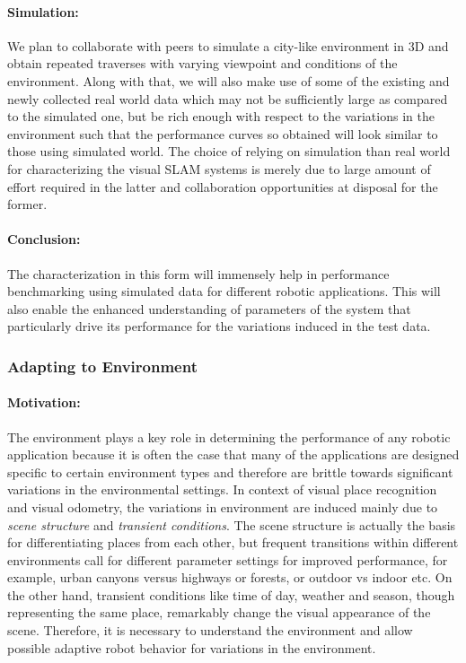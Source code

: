 \documentclass{article}
\begin{document}
\paragraph{Simulation:}We plan to collaborate with peers to simulate a city-like environment in 3D and obtain repeated traverses with varying viewpoint and conditions of the environment. Along with that, we will also make use of some of the existing and newly collected real world data which may not be sufficiently large as compared to the simulated one, but be rich enough with respect to the variations in the environment such that the performance curves so obtained will look similar to those using simulated world. The choice of relying on simulation than real world for characterizing the visual SLAM systems is merely due to large amount of effort required in the latter and collaboration opportunities at disposal for the former. 

\paragraph{Conclusion:}The characterization in this form will immensely help in performance benchmarking using simulated data for different robotic applications. This will also enable the enhanced understanding of parameters of the system that particularly drive its performance for the variations induced in the test data.

\subsubsection{Adapting to Environment}
\paragraph{Motivation:}The environment plays a key role in determining the performance of any robotic application because it is often the case that many of the applications are designed specific to certain environment types and therefore are brittle towards significant variations in the environmental settings. In context of visual place recognition and visual odometry, the variations in environment are induced mainly due to \emph{scene structure} and \emph{transient conditions}. The scene structure is actually the basis for differentiating places from each other, but frequent transitions within different environments call for different parameter settings for improved performance, for example, urban canyons versus highways or forests, or outdoor vs indoor etc. On the other hand, transient conditions like time of day, weather and season, though representing the same place, remarkably change the visual appearance of the scene. Therefore, it is necessary to understand the environment and allow possible adaptive robot behavior for variations in the environment.
\end{document}
